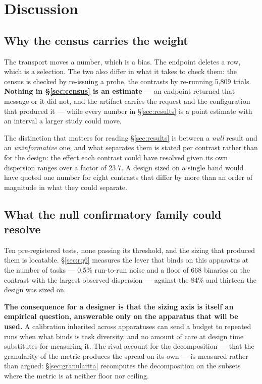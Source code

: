 \section{Discussion}
\label{sec:discussion}

\subsection{Why the census carries the weight}

The transport moves a number, which is a bias. The endpoint deletes a row, which is a selection. The two
also differ in what it takes to check them: the census is checked by re-issuing a probe, the contrasts by
re-running 5{,}809 trials. \textbf{Nothing in \S\ref{sec:census} is an estimate} --- an endpoint returned
that message or it did not, and the artifact carries the request and the configuration that produced it ---
while every number in \S\ref{sec:results} is a point estimate with an interval a larger study could move.

The distinction that matters for reading \S\ref{sec:results} is between a \emph{null} result and an
\emph{uninformative} one, and what separates them is stated per contrast rather than for the design: the
effect each contrast could have resolved given its own dispersion ranges over a factor of 23.7. A design
sized on a single band would have quoted one number for eight contrasts that differ by more than an order
of magnitude in what they could separate.


\subsection{What the null confirmatory family could resolve}

Ten pre-registered tests, none passing its threshold, and the sizing that produced them is locatable.
\S\ref{sec:rq6} measures the lever that binds on this apparatus at the number of tasks --- 0.5\%
run-to-run noise and a floor of 668 binaries on the contrast with the largest observed dispersion ---
against the 84\% and thirteen the design was sized on.

\textbf{The consequence for a designer is that the sizing axis is itself an empirical question, answerable
only on the apparatus that will be used.} A calibration inherited across apparatuses can send a budget to
repeated runs when what binds is task diversity, and no amount of care at design time substitutes for
measuring it. The rival account for the decomposition --- that the granularity of the metric produces the
spread on its own --- is measured rather than argued: \S\ref{sec:granularita} recomputes the decomposition
on the subsets where the metric is at neither floor nor ceiling.

